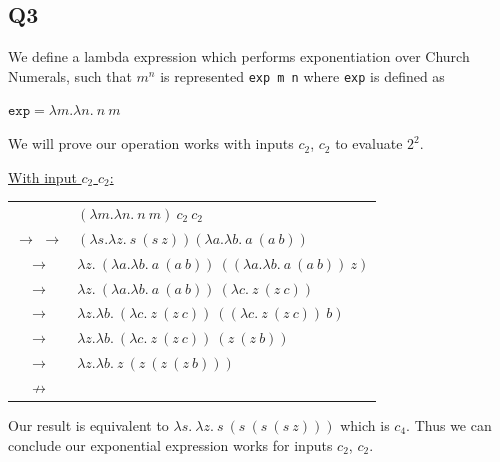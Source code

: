 \documentclass[12pt, fleqn]{article}
\begin{document}
\subsection{Q3}

We define a lambda expression which performs exponentiation over Church Numerals, such that
\texttt{$m^n$} is represented \verb|exp m n| where \verb|exp| is defined as
\begin{center}
    $\texttt{exp} = \lambda m. \lambda n.\:n\:m$
\end{center}

\medskip
We will prove our operation works with inputs $c_2$, $c_2$ to evaluate $2^2$.

\medskip

\underline{With input \texttt{$c_2$} \texttt{$c_2$}:}
\begin{center}
    \begin{tabular}{c l}
    & $(\lambda m. \lambda n.\:n\:m)\:c_2\:c_2$ \\ 
    $\rightarrow$ $\rightarrow$ & $(\lambda s. \lambda z.\:s\:(s\:z)) (\lambda a.\lambda b.\:a\:(a\:b))$ \\
    $\rightarrow$ & $\lambda z.\: (\lambda a.\lambda b.\:a\:(a\:b))\:((\lambda a.\lambda b.\:a\:(a\:b))\:z)$ \\
    $\rightarrow$ & $\lambda z.\: (\lambda a.\lambda b.\:a\:(a\:b))\:(\lambda c.\:z\:(z\:c))$ \\
    $\rightarrow$ & $\lambda z.\lambda b.\:(\lambda c.\:z\:(z\:c))\:((\lambda c.\:z\:(z\:c))\:b)$ \\
    $\rightarrow$ & $\lambda z.\lambda b.\:(\lambda c.\:z\:(z\:c))\:(z\:(z\:b))$ \\
    $\rightarrow$ & $\lambda z.\lambda b.\:z\:(z\:(z\:(z\:b)))$ \\
    $\nrightarrow$ & \\
    \end{tabular}
\end{center}

Our result is equivalent to $\lambda s.\: \lambda z.\:s\:(s\:(s\:(s\:z)))$ which is $c_4$. Thus we can conclude our exponential expression
works for inputs $c_2$, $c_2$.
\end{document}
